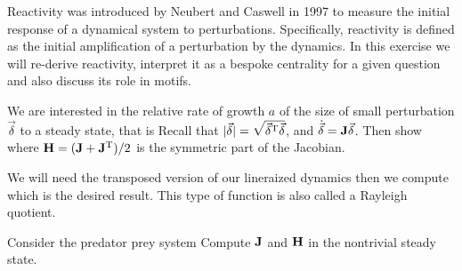 
Reactivity was introduced by Neubert and Caswell in 1997 to measure the initial response of a dynamical system to perturbations. Specifically, reactivity is defined as the initial amplification of a perturbation by the dynamics. In this exercise we will re-derive reactivity, interpret it as a bespoke centrality for a given question and also discuss its role in motifs. 

\subquestion
We are interested in the relative rate of growth $a$ of the size of small perturbation $\vec{\delta}$ to a steady state, that is 
Recall that $|\vec{\delta}|=\sqrt{\vec{\delta}^{\rm T}\vec{\delta}}$, and $\dot{\vec{\delta}}={\bf J}\vec{\delta}$. Then show 
where ${\bf H} = ({\bf J}+{\bf J}^{\rm T})/2$ is the symmetric part of the Jacobian. 

\solution
We will need the transposed version of our lineraized dynamics
then we compute
which is the desired result. This type of function is also called a Rayleigh quotient.

\subquestion 
Consider the predator prey system 
Compute $\bf J$ and $\bf H$ in the nontrivial steady state.

